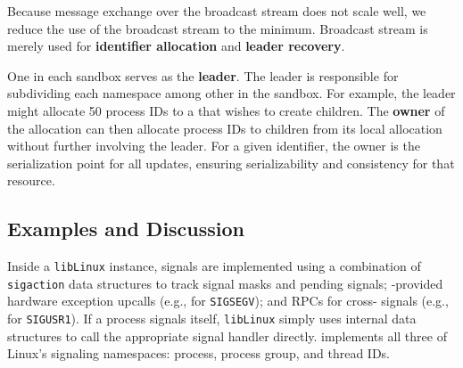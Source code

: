 Because message exchange over the broadcast stream does not scale well,
we reduce the use of the broadcast stream to the minimum.
Broadcast stream is merely used for {\bf \picoproc{} identifier allocation}
and {\bf leader recovery}.

One \picoproc{} in each sandbox serves as the {\bf leader}.
The leader is responsible for subdividing each namespace among other \picoprocs{} 
in the sandbox.
For example, the leader might allocate 50 process IDs to a \picoproc{}
that wishes to create children.  The {\bf owner} of the allocation can then allocate process IDs
to children from its local allocation without further involving the leader.
For a given identifier, the owner is the serialization point for all updates,
ensuring serializability and consistency for that resource.

\subsection{Examples and Discussion}

 Inside a {\tt libLinux} instance, signals are implemented using a combination of 
{\tt sigaction} data structures %
to track signal masks and pending signals;
\pal{}-provided hardware exception upcalls (e.g., for {\tt SIGSEGV});
and  RPCs for cross-\picoproc{} signals (e.g., for  {\tt SIGUSR1}).
If a process signals itself, {\tt libLinux} simply uses internal data structures
to call the appropriate signal handler directly.
\graphene{} implements all three of Linux's signaling namespaces:
process, process group, and thread IDs.

